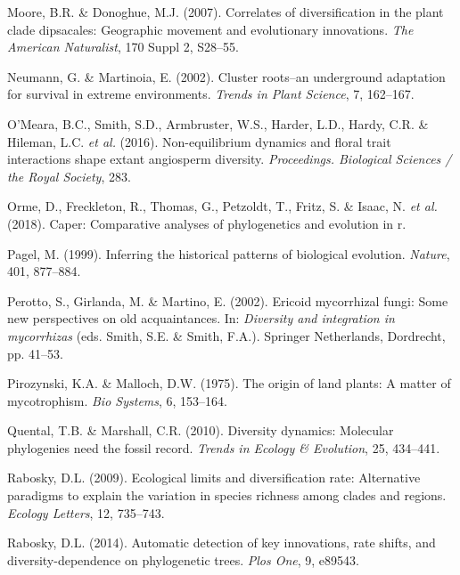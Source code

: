 \documentclass[12pt,]{article}
\begin{document}
\leavevmode\hypertarget{ref-moore_2007}{}%
Moore, B.R. \& Donoghue, M.J. (2007). Correlates of diversification in
the plant clade dipsacales: Geographic movement and evolutionary
innovations. \emph{The American Naturalist}, 170 Suppl 2, S28--55.

\leavevmode\hypertarget{ref-neumann_2002}{}%
Neumann, G. \& Martinoia, E. (2002). Cluster roots--an underground
adaptation for survival in extreme environments. \emph{Trends in Plant
Science}, 7, 162--167.

\leavevmode\hypertarget{ref-omeara_2016}{}%
O'Meara, B.C., Smith, S.D., Armbruster, W.S., Harder, L.D., Hardy, C.R.
\& Hileman, L.C. \emph{et al.} (2016). Non-equilibrium dynamics and
floral trait interactions shape extant angiosperm diversity.
\emph{Proceedings. Biological Sciences / the Royal Society}, 283.

\leavevmode\hypertarget{ref-orme_software_2018}{}%
Orme, D., Freckleton, R., Thomas, G., Petzoldt, T., Fritz, S. \& Isaac,
N. \emph{et al.} (2018). Caper: Comparative analyses of phylogenetics
and evolution in r.

\leavevmode\hypertarget{ref-pagel_1999}{}%
Pagel, M. (1999). Inferring the historical patterns of biological
evolution. \emph{Nature}, 401, 877--884.

\leavevmode\hypertarget{ref-perotto_2002}{}%
Perotto, S., Girlanda, M. \& Martino, E. (2002). Ericoid mycorrhizal
fungi: Some new perspectives on old acquaintances. In: \emph{Diversity
and integration in mycorrhizas} (eds. Smith, S.E. \& Smith, F.A.).
Springer Netherlands, Dordrecht, pp. 41--53.

\leavevmode\hypertarget{ref-pirozynski_1975}{}%
Pirozynski, K.A. \& Malloch, D.W. (1975). The origin of land plants: A
matter of mycotrophism. \emph{Bio Systems}, 6, 153--164.

\leavevmode\hypertarget{ref-quental_2010}{}%
Quental, T.B. \& Marshall, C.R. (2010). Diversity dynamics: Molecular
phylogenies need the fossil record. \emph{Trends in Ecology \&
Evolution}, 25, 434--441.

\leavevmode\hypertarget{ref-rabosky_2009}{}%
Rabosky, D.L. (2009). Ecological limits and diversification rate:
Alternative paradigms to explain the variation in species richness among
clades and regions. \emph{Ecology Letters}, 12, 735--743.

\leavevmode\hypertarget{ref-rabosky_2014}{}%
Rabosky, D.L. (2014). Automatic detection of key innovations, rate
shifts, and diversity-dependence on phylogenetic trees. \emph{Plos One},
9, e89543.
\end{document}
